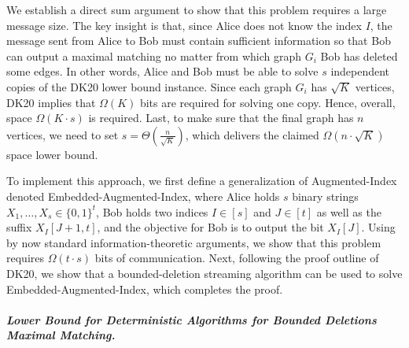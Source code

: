 \documentclass[11pt,a4paper]{article}
\begin{document}
We establish a direct sum argument to show that this problem requires a large message size. The key insight is that, since Alice does not know the index $I$, the message sent from Alice to Bob must contain sufficient information so that Bob can output a maximal matching no matter from which graph $G_i$ Bob has deleted some edges. In other words, Alice and Bob must be able to solve $s$ independent copies of the DK20 lower bound instance. Since each graph $G_i$ has $\sqrt{K}$ vertices, DK20 implies that $\Omega(K)$ bits are required for solving one copy. Hence, overall, space $\Omega(K \cdot s)$ is required. Last, to make sure that the final graph has $n$ vertices, we need to set $s = \Theta(\frac{n}{\sqrt{K}})$, which delivers the claimed $\Omega(n \cdot \sqrt{K})$ space lower bound.

To implement this approach, we first define a generalization of \textsf{Augmented-Index} denoted \textsf{Embedded-Augmented-Index}, where Alice holds $s$ binary strings $X_1, \dots, X_s \in \{0, 1\}^t$, Bob holds two indices $I \in [s]$ and $J \in [t]$ as well as the suffix $X_I[J+1, t]$, and the objective for Bob is to output the bit $X_I[J]$.
Using by now standard information-theoretic arguments, we show that this problem requires $\Omega(t \cdot s)$ bits of communication. Next, following the proof outline of DK20, we show that a bounded-deletion streaming algorithm can be used to solve \textsf{Embedded-Augmented-Index}, which completes the proof.


\subparagraph{Lower Bound for Deterministic Algorithms for Bounded Deletions \textsf{Maximal Matching}.}

\end{document}
